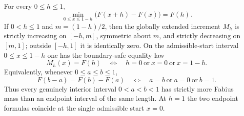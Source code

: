 \begin{theorem}
\label{co:thm:least-mass}
For every $0\le h\le1$,
\begin{equation}\label{co:eq:least-mass}
 \min_{0\le x\le1-h}\bigl(F(x+h)-F(x)\bigr)=F(h).
\end{equation}
If $0<h\le1$ and $m=(1-h)/2$, then the globally extended increment $M_h$ is
strictly increasing on $[-h,m]$, symmetric about $m$, and strictly decreasing
on $[m,1]$; outside $[-h,1]$ it is identically zero.  On the admissible-start
interval $0\le x\le1-h$ one has the boundary-safe equality law
\begin{equation}\label{co:eq:least-mass-equality}
 M_h(x)=F(h)
 \quad\Longleftrightarrow\quad
 h=0\ \text{or}\ x=0\ \text{or}\ x=1-h.
\end{equation}
Equivalently, whenever $0\le a\le b\le1$,
\begin{equation}\label{co:eq:least-mass-equality-ab}
 F(b-a)=F(b)-F(a)
 \quad\Longleftrightarrow\quad
 a=b\ \text{or}\ a=0\ \text{or}\ b=1.
\end{equation}
Thus every genuinely interior interval $0<a<b<1$ has strictly more Fabius
mass than an endpoint interval of the same length.  At $h=1$ the two endpoint
formulas coincide at the single admissible start $x=0$.
\end{theorem}

